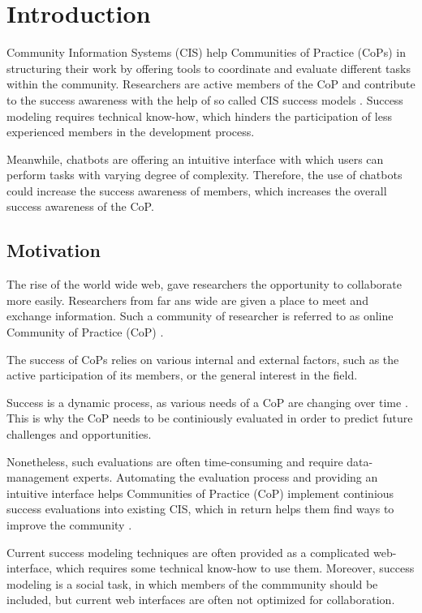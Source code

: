 \chapter{Introduction}
Community Information Systems (CIS) help Communities of Practice (CoPs) in structuring their work by offering tools to coordinate and evaluate different tasks within the community. Researchers are active members of the CoP and contribute to the success awareness with the help of so called CIS success models \cite{Klam10c}. Success modeling requires technical know-how, which hinders the participation of less experienced members in the development process.

Meanwhile, chatbots are offering an intuitive interface with which users can perform tasks with varying degree of complexity. Therefore, the use of chatbots could increase the success awareness of members, which increases the overall success awareness of the CoP.

\section{Motivation}
The rise of the world wide web, gave researchers the opportunity to collaborate more easily. Researchers from far ans wide are given a place to meet and exchange information. Such a community of researcher is referred to as online Community of Practice (CoP) \cite{Renz08}.

The success of CoPs relies on various internal and external factors, such as the active participation of its members, or the general interest in the field.

Success is a dynamic process, as various needs of a CoP are changing over time \cite{Renz08,GKJa08}.
This is why the CoP needs to be continiously evaluated in order to predict future challenges and opportunities.

Nonetheless, such evaluations are often time-consuming and require data-management experts.
Automating the evaluation process and providing an intuitive interface helps Communities of Practice (CoP) implement continious success evaluations into  existing CIS, which in return helps them find ways to improve the community \cite{Renz08}.

Current success modeling techniques are often provided as a complicated web-interface, which requires some technical know-how to use them.
Moreover, success modeling is a social task, in which members of the commmunity should be included, but current web interfaces are often not optimized for collaboration.

